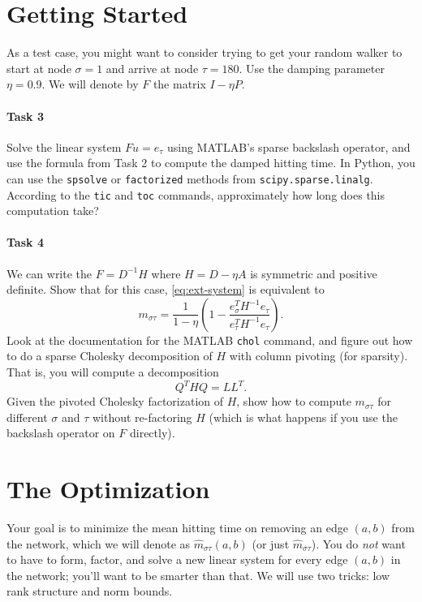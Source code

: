 \documentclass[12pt, leqno]{article}
\begin{document}
\section*{Getting Started}

As a test case, you might want to consider trying to get your random
walker to start at node $\sigma = 1$ and arrive at node $\tau = 180$.
Use the damping parameter $\eta = 0.9$.  We will denote by $F$ the
matrix $I-\eta P$.

\paragraph*{Task 3}
Solve the linear system $F u = e_\tau$ using MATLAB's sparse
backslash operator, and use the formula from Task 2 to compute the
damped hitting time.  In Python, you can use the {\tt spsolve} or
{\tt factorized} methods from {\tt scipy.sparse.linalg}.
According to the {\tt tic} and {\tt toc} commands,
approximately how long does this computation take?

\paragraph*{Task 4}
We can write the $F = D^{-1} H$ where $H = D-\eta A$ is symmetric and
positive definite.  Show that for this case,
\eqref{eq:ext-system} is equivalent to
\[
m_{\sigma \tau} =
\frac{1}{1-\eta}
\left(
  1 - \frac{e_{\sigma}^T H^{-1} e_{\tau}}{e_{\tau}^T H^{-1} e_{\tau}}
\right).
\]
Look at the documentation for the MATLAB
{\tt chol} command, and figure out how to do a sparse Cholesky decomposition of
$H$ with column pivoting (for sparsity).  That is, you will compute a
decomposition
\[
  Q^T H Q = LL^T.
\]
Given the pivoted Cholesky factorization of $H$, show how to compute
$m_{\sigma \tau}$ for different $\sigma$ and $\tau$ without
re-factoring $H$ (which is what happens if you use the backslash
operator on $F$ directly).

\section*{The Optimization}

Your goal is to minimize the mean hitting time on removing an edge
$(a,b)$ from the network, which we will denote as
$\hat{m}_{\sigma \tau}(a,b)$ (or just $\hat{m}_{\sigma \tau}$). You do
{\em not} want to have to form, factor, and solve a new linear system
for every edge $(a,b)$ in the network; you'll want to be smarter than
that.  We will use two tricks: low rank structure and norm bounds.
\end{document}
